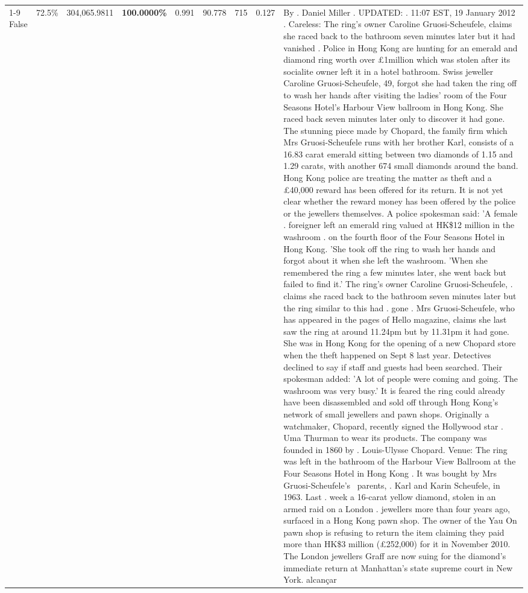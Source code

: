 \begin{table}[H]
\begin{tabular}{lllrlllll}
\cline{1-9} \cline{2-9}
False & 72.5\% & \color{red} 304,065.9811 & \bfseries \color{red} 100.0000\% & 0.991 & 90.778 & 715 & 0.127 & By . Daniel Miller . UPDATED: . 11:07 EST, 19 January 2012 . Careless: The ring's owner Caroline Gruosi-Scheufele, claims she raced back to the bathroom seven minutes later but it had vanished . Police in Hong Kong are hunting for an emerald and diamond ring worth over £1million which was stolen after its socialite owner left it in a hotel bathroom. Swiss jeweller Caroline Gruosi-Scheufele, 49, forgot she had taken the ring off to wash her hands after visiting the ladies' room of the Four Seasons Hotel's Harbour View ballroom in Hong Kong. She raced back seven minutes later only to discover it had gone. The stunning piece made by Chopard, the family firm which Mrs Gruosi-Scheufele runs with her brother Karl, consists of a 16.83 carat emerald sitting between two diamonds of 1.15 and 1.29 carats, with another 674 small diamonds around the band. Hong Kong police are treating the matter as theft and a £40,000 reward has been offered for its return. It is not yet clear whether the reward money has been offered by the police or the jewellers themselves. A police spokesman said: 'A female . foreigner left an emerald ring valued at HK\$12 million in the washroom . on the fourth floor of the Four Seasons Hotel in Hong Kong. 'She took off the ring to wash her hands and forgot about it when she left the washroom. 'When she remembered the ring a few minutes later, she went back but failed to find it.' The ring's owner Caroline Gruosi-Scheufele, . claims she raced back to the bathroom seven minutes later but the ring similar to this had . gone . Mrs Gruosi-Scheufele, who has appeared in the pages of Hello magazine, claims she last saw the ring at around 11.24pm but by 11.31pm it had gone. She was in Hong Kong for the opening of a new Chopard store when the theft happened on Sept 8 last year. Detectives declined to say if staff and guests had been searched. Their spokesman added: 'A lot of people were coming and going. The washroom was very busy.' It is feared the ring could already have been disassembled and sold off through Hong Kong's network of small jewellers and pawn shops. Originally a watchmaker, Chopard, recently signed the Hollywood star . Uma Thurman to wear its products. The company was founded in 1860 by . Louis-Ulysse Chopard. Venue: The ring was left in the bathroom of the Harbour View Ballroom at the Four Seasons Hotel in Hong Kong . It was bought by Mrs Gruosi-Scheufele's  parents, . Karl and Karin Scheufele, in 1963. Last . week a 16-carat yellow diamond, stolen in an armed raid on a London . jewellers more than four years ago, surfaced in a Hong Kong pawn shop. The owner of the Yau On pawn shop is refusing to return the item claiming they paid more than HK\$3 million (£252,000) for it in November 2010. The London jewellers Graff are now suing for the diamond’s immediate return at Manhattan’s state supreme court in New York. alcançar \\

\end{tabular}
\end{table}
